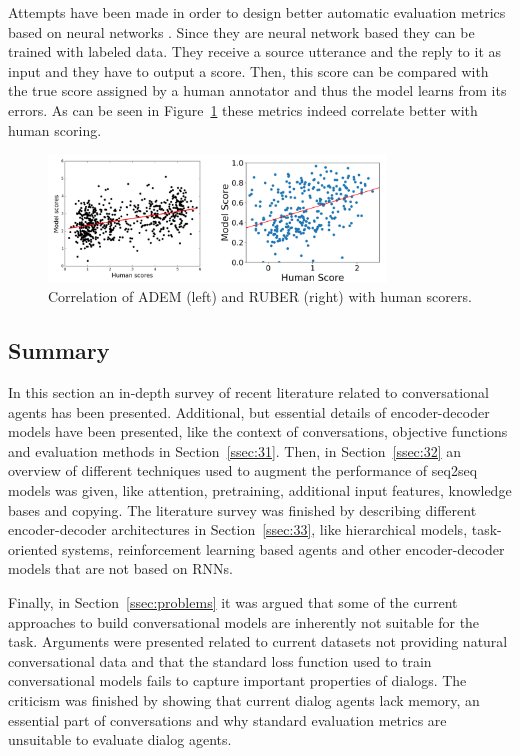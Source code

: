 \documentclass[12pt]{article}
\begin{document}
Attempts have been made in order to design better automatic evaluation metrics based on neural networks \cite{Tao:2017,Lowe:2017,Li_adversarial:2017}. Since they are neural network based they can be trained with labeled data. They receive a source utterance and the reply to it as input and they have to output a score. Then, this score can be compared with the true score assigned by a human annotator and thus the model learns from its errors. As can be seen in Figure~\ref{fig:adem_ruber} these metrics indeed correlate better with human scoring.
\begin{figure}[H]
	\centering
	\includegraphics[width=0.8\textwidth]{pics/adem_ruber.png}
	\caption{Correlation of ADEM (left) \cite{Lowe:2017} and RUBER (right) \cite{Tao:2017} with human scorers.}
	\label{fig:adem_ruber}
\end{figure}

\subsection{Summary} \label{ssec:summary}
In this section an in-depth survey of recent literature related to conversational agents has been presented. Additional, but essential details of encoder-decoder models have been presented, like the context of conversations, objective functions and evaluation methods in Section~\ref{ssec:31}. Then, in Section~\ref{ssec:32} an overview of different techniques used to augment the performance of seq2seq models was given, like attention, pretraining, additional input features, knowledge bases and copying. The literature survey was finished by describing different encoder-decoder architectures in Section~\ref{ssec:33}, like hierarchical models, task-oriented systems, reinforcement learning based agents and other encoder-decoder models that are not based on RNNs.

Finally, in Section~\ref{ssec:problems} it was argued that some of the current approaches to build conversational models are inherently not suitable for the task. Arguments were presented related to current datasets not providing natural conversational data and that the standard loss function used to train conversational models fails to capture important properties of dialogs. The criticism was finished by showing that current dialog agents lack memory, an essential part of conversations and why standard evaluation metrics are unsuitable to evaluate dialog agents.
    
\end{document}

